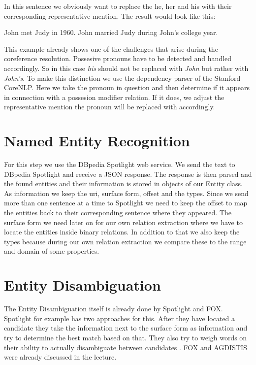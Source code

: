 \documentclass[runningheads]{llncs}
\begin{document}
In this sentence we obviously want to replace the he, her and his with their corresponding representative mention.
The result would look like this: 

\begin{example} John met Judy in 1960. John married Judy during John's college year. \end{example}


This example already shows one of the challenges that arise during the coreference resolution. Possesive pronouns have to be detected and handled accordingly. So in this case \textit{his} should not be replaced with \textit{John} but rather with \textit{John's}. To make this distinction we use the dependency parser \cite{parser} of the Stanford CoreNLP. Here we take the pronoun in question and then determine if it appears in connection with a possesion modifier relation. If it does, we adjust the representative mention the pronoun will be replaced with accordingly.



\section{Named Entity Recognition}
For this step we use the DBpedia Spotlight web service. We send the text to DBpedia Spotlight and receive a JSON response. The response is then parsed and the found entities and their information is stored in objects of our Entity class. As information we keep the uri, surface form, offset and the types. Since we send more than one sentence at a time to Spotlight we need to keep the offset to map the entities back to their corresponding sentence where they appeared. The surface form we need later on for our own relation extraction where we have to locate the entities inside binary relations. In addition to that we also keep the types because during our own relation extraction we compare these to the range and domain of some properties.





\section{Entity Disambiguation}
The Entity Disambiguation itself is already done by Spotlight and FOX. Spotlight for example has two approaches for this.
After they have located a candidate they take the information next to the surface form as information and try to determine the best match based on that. They also try to weigh words on their ability to actually disambiguate between candidates \cite{disambiguate}. FOX and AGDISTIS \cite{agdistis} \cite{agdistis2} were already discussed in the lecture.
\end{document}
